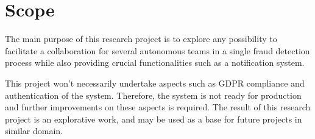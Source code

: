 \section{Scope}

  The main purpose of this research project is to explore any possibility to facilitate a collaboration for several autonomous teams in a single fraud detection process while also providing crucial functionalities such as a notification system. 

  This project won't necessarily undertake aspects such as GDPR compliance and authentication of the system. Therefore, the system is not ready for production and further improvements on these aspects is required. The result of this research project is an explorative work, and may be used as a base for future projects in similar domain.  